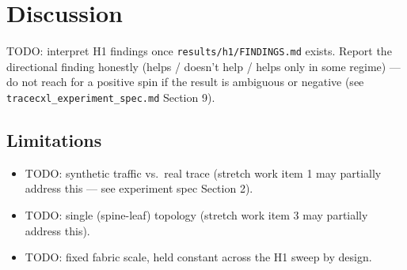 %

\section{Discussion}
\label{sec:discussion}

TODO: interpret H1 findings once \texttt{results/h1/FINDINGS.md} exists.
Report the directional finding honestly (helps / doesn't help / helps
only in some regime) — do not reach for a positive spin if the result is
ambiguous or negative (see \texttt{tracecxl\_experiment\_spec.md}
Section 9).

\subsection{Limitations}
\begin{itemize}
  \item TODO: synthetic traffic vs.\ real trace (stretch work item 1 may
        partially address this — see experiment spec Section 2).
  \item TODO: single (spine-leaf) topology (stretch work item 3 may
        partially address this).
  \item TODO: fixed fabric scale, held constant across the H1 sweep by
        design.
\end{itemize}
